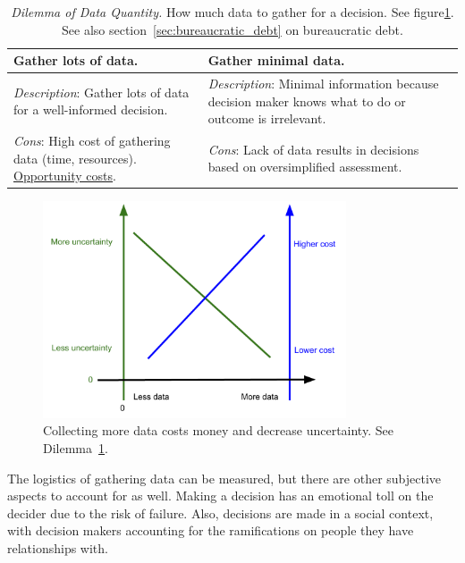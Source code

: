 \begin{center}
\begin{table}[H] %
\begin{tabular}{ | m{\dilemmatablewidth}| m{\dilemmatablewidth} | } 
  \hline
  \textbf{Gather lots of data.} &
  \textbf{Gather minimal data.} \\
  \hline
  \textit{Description}: Gather lots of data for a well-informed decision. &
  \textit{Description}: Minimal information because decision maker knows what to do or outcome is irrelevant.  \\  
  \hline
  \textit{Cons}: High cost of gathering data (time, resources). \href{https://en.wikipedia.org/wiki/Opportunity_cost}{Opportunity costs}. & 
  \textit{Cons}: Lack of data results in decisions based on oversimplified assessment. \\
  \hline
\end{tabular}
\caption{\textit{Dilemma of Data Quantity.}
How much data to gather for a decision. See figure\ref{fig:data_collection_cost_uncertainty}. See also section~\ref{sec:bureaucratic_debt} on bureaucratic debt.
}
\label{table:gather_data_lots-vs-little}
\end{table}
\end{center}

\begin{figure}[H] %
        \centering
        \includegraphics[width=0.8\textwidth]{images/cost_and_uncertainty_for_data_collection}
        \caption{Collecting more data costs money and decrease uncertainty. See Dilemma~\ref{table:gather_data_lots-vs-little}.}
        \label{fig:data_collection_cost_uncertainty}
\end{figure}

The logistics of gathering data can be measured, but there are other subjective aspects to account for as well. Making a decision has an emotional toll on the decider due to the risk of failure. Also, decisions are made in a social context, with decision makers accounting for the ramifications on people they have relationships with. 


